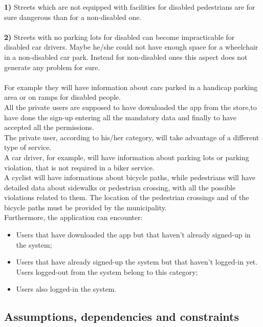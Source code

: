 \documentclass[titlepage]{article}
\begin{document}
\textbf{1)} Streets which are not equipped with facilities for disabled pedestrians are for sure dangerous than for a non-disabled one.\\ \\
\textbf{2)} Streets with no parking lots for disabled can become impracticable for disabled car drivers. Maybe he/she could not have enough space for a wheelchair in a non-disabled car park. Instead for non-disabled ones this aspect does not generate any problem for sure. \\ \\
For example they will have information about cars parked in a handicap parking area or on ramps for disabled people.\\
All the private users are supposed to have downloaded the app from the store,to have done the sign-up entering all the mandatory data and finally to have accepted all the permissions.\\
The private user, according to his/her category, will take advantage of a different type of service.\\
A car driver, for example, will have information about parking lots or parking violation, that is not required in a biker service.\\
A cyclist will have informations about bicycle paths, while pedestrians will have detailed data about sidewalks or pedestrian crossing, with all the possible violations related to them. The location of the pedestrian crossings and of the bicycle paths must be provided by the municipality.  \\
Furthermore, the application can encounter:
\begin{itemize}
	\item Users that have downloaded the app but that haven't already signed-up in the system;
	\item Users that have already signed-up the system but that haven't logged-in yet. Users logged-out from the system belong to this category;
	\item Users also logged-in the system.\\
	
\end{itemize}

 



\subsection{Assumptions, dependencies and constraints}
\end{document}
